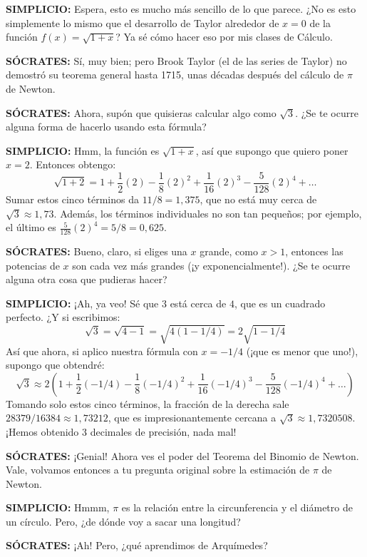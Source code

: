 \noindent \textbf{SIMPLICIO:} Espera, esto es mucho más sencillo de lo
que parece. ¿No es esto simplemente lo mismo que el desarrollo de Taylor
alrededor de $x = 0$ de la función $f(x) = \sqrt{1 + x}$? Ya sé cómo
hacer eso por mis clases de Cálculo.

\noindent \textbf{SÓCRATES:} Sí, muy bien; pero Brook Taylor (el de las
series de Taylor) no demostró su teorema general hasta 1715, unas
décadas después del cálculo de $\pi$ de Newton.

\noindent \textbf{SÓCRATES:} Ahora, supón que quisieras calcular algo
como $\sqrt{3}$. ¿Se te ocurre alguna forma de hacerlo usando esta
fórmula?

\noindent \textbf{SIMPLICIO:} Hmm, la función es $\sqrt{1 + x}$, así que
supongo que quiero poner $x = 2$. Entonces obtengo:
\[ \sqrt{1 + 2} = 1 + \frac{1}{2}(2) - \frac{1}{8}(2)^2 + \frac{1}{16}(2)^3 - \frac{5}{128}(2)^4 + \dots \]
Sumar estos cinco términos da $11/8 = 1,375$, que no está muy cerca de
$\sqrt{3} \approx 1,73$. Además, los términos individuales no son tan
pequeños; por ejemplo, el último es $\frac{5}{128}(2)^4 = 5/8 = 0,625$.

\noindent \textbf{SÓCRATES:} Bueno, claro, si eliges una $x$ grande,
como $x > 1$, entonces las potencias de $x$ son cada vez más grandes (¡y
exponencialmente!). ¿Se te ocurre alguna otra cosa que pudieras hacer?

\noindent \textbf{SIMPLICIO:} ¡Ah, ya veo! Sé que $3$ está cerca de $4$,
que es un cuadrado perfecto. ¿Y si escribimos:
\[ \sqrt{3} = \sqrt{4 - 1} = \sqrt{4(1 - 1/4)} = 2\sqrt{1 - 1/4} \]
Así que ahora, si aplico nuestra fórmula con $x = -1/4$ (¡que es menor
que uno!), supongo que obtendré:
\[ \sqrt{3} \approx 2 \left( 1 + \frac{1}{2}(-1/4) - \frac{1}{8}(-1/4)^2 + \frac{1}{16}(-1/4)^3 - \frac{5}{128}(-1/4)^4 + \dots \right) \]
Tomando solo estos cinco términos, la fracción de la derecha sale
$28379/16384 \approx 1,73212$, que es impresionantemente cercana a $\sqrt{3} \approx
1,7320508$. ¡Hemos obtenido 3 decimales de precisión, nada mal!

\noindent \textbf{SÓCRATES:} ¡Genial! Ahora ves el poder del Teorema del
Binomio de Newton. Vale, volvamos entonces a tu pregunta original sobre
la estimación de $\pi$ de Newton.

\noindent \textbf{SIMPLICIO:} Hmmm, $\pi$ es la relación entre la
circunferencia y el diámetro de un círculo. Pero, ¿de dónde voy a sacar
una longitud?

\noindent \textbf{SÓCRATES:} ¡Ah! Pero, ¿qué aprendimos de Arquímedes?

